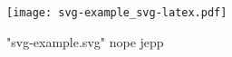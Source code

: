 \documentclass[ngerman]{scrartcl}
\begin{document}
\makeatletter

% 

\texttt{[image: svg-example\_svg-latex.pdf]}

\makeatletter
\meaning@path

\meaning\Ginput@path

\meaning\@filef@und

\meaning\@filef@und

\openin\@inputcheck"svg-example.svg" %
\ifeof\@inputcheck
nope
\else
jepp
\fi

%
%
%

%
%

%
%

%
\end{document}

